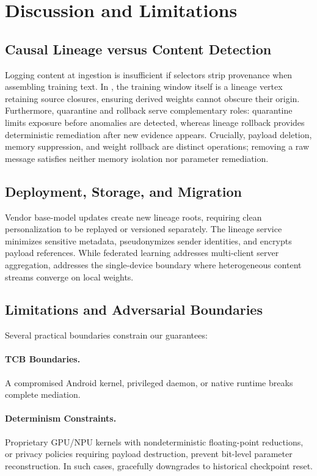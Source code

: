 \section{Discussion and Limitations}
\label{sec:discussion}

\subsection{Causal Lineage versus Content Detection}
Logging content at ingestion is insufficient if selectors strip provenance when assembling training text. In \PG{}, the training window itself is a lineage vertex retaining source closures, ensuring derived weights cannot obscure their origin. Furthermore, quarantine and rollback serve complementary roles: quarantine limits exposure before anomalies are detected, whereas lineage rollback provides deterministic remediation after new evidence appears. Crucially, payload deletion, memory suppression, and weight rollback are distinct operations; removing a raw message satisfies neither memory isolation nor parameter remediation.

\subsection{Deployment, Storage, and Migration}
Vendor base-model updates create new lineage roots, requiring clean personalization to be replayed or versioned separately. The lineage service minimizes sensitive metadata, pseudonymizes sender identities, and encrypts payload references. While federated learning addresses multi-client server aggregation, \PG{} addresses the single-device boundary where heterogeneous content streams converge on local weights.

\subsection{Limitations and Adversarial Boundaries}
\label{sec:limitations}
Several practical boundaries constrain our guarantees:
\paragraph{TCB Boundaries.} A compromised Android kernel, privileged daemon, or native runtime breaks complete mediation.
\paragraph{Determinism Constraints.} Proprietary GPU/NPU kernels with nondeterministic floating-point reductions, or privacy policies requiring payload destruction, prevent bit-level parameter reconstruction. In such cases, \PG{} gracefully downgrades to historical checkpoint reset.
